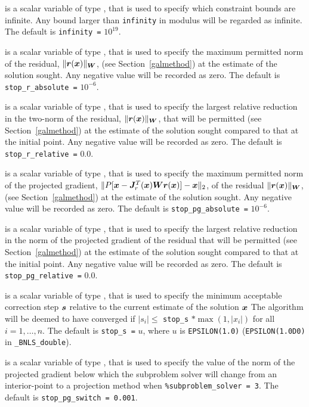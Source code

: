 \documentclass{galahad}
\newcommand{\packagename}{BNLS}
\newcommand{\fullpackagename}{\libraryname\_\packagename}
\begin{document}
\begin{description}
 is a scalar variable of type \realdp, that is used to
specify which constraint bounds are infinite.
Any bound larger than {\tt infinity} in modulus will be regarded as infinite.
The default is {\tt infinity =} $10^{19}$.

 is a scalar variable of type \realdp,
that is used to specify the maximum permitted norm of the
residual, $\|{\bm{r}}({\bm{x}})\|_{{\bm{W}}}$,
(see Section~\ref{galmethod}) at the estimate of the solution sought.
Any negative value will be recorded as zero.
The default is {\tt stop\_r\_absolute =} $10^{-6}$.

 is a scalar variable of type \realdp,
that is used to specify the largest relative reduction in the two-norm of the
residual, $\|{\bm{r}}({\bm{x}})\|_{{\bm{W}}}$, that will be permitted
(see Section~\ref{galmethod}) at the estimate of the solution sought
compared to that at the initial point.
Any negative value will be recorded as zero.
The default is {\tt stop\_r\_relative =} $0.0$.

 is a scalar variable of type \realdp, that is used 
to specify the maximum permitted norm of the projected gradient,
$\|P[{\bm{x}} - {\bm{J}}_r^T({\bm{x}}) {\bm{W}} {\bm{r}}({\bm{x}})] - {\bm{x}}\|_2$,
of the residual  $\|{\bm{r}}({\bm{x}})\|_{{\bm{W}}}$,
(see Section~\ref{galmethod}) at the estimate of the solution sought.
Any negative value will be recorded as zero.
The default is {\tt stop\_pg\_absolute =} $10^{-6}$.

 is a scalar variable of type \realdp,
that is used to specify the largest relative reduction in the norm of the
projected gradient of the residual that will be permitted
(see Section~\ref{galmethod}) at the estimate of the solution sought
compared to that at the initial point.
Any negative value will be recorded as zero.
The default is {\tt stop\_pg\_relative =} $0.0$.

 is a scalar variable of type \realdp,
that is used to specify the minimum acceptable correction step ${\bm{s}}$
relative to the current estimate of the solution ${\bm{x}}$
The algorithm will be deemed to have converged if $|s_i| \leq$
{\tt stop\_s} $\ast \max( 1, |x_i|)$ for all $i = 1, \ldots, n$.
The default is {\tt stop\_s =} $u$,
where $u$ is {\tt EPSILON(1.0)} ({\tt EPSILON(1.0D0)} in
{\tt \fullpackagename\_double}).

 is a scalar variable of type \realdp, that is used 
to specify the value of the norm of the projected gradient below which
the subproblem solver will change from an interior-point to a projection 
method when {\tt \%subproblem\_solver = 3}. 
The default is {\tt stop\_pg\_switch = 0.001}.


\end{description}
\end{document}

